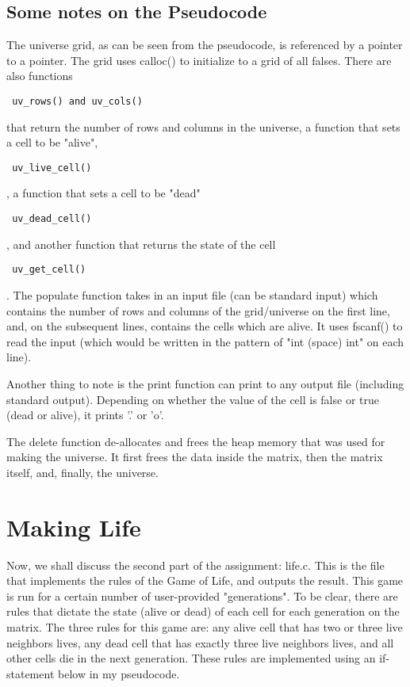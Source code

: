 \documentclass[11pt]{article}
\begin{document}
\subsection{Some notes on the Pseudocode}
The universe grid, as can be seen from the pseudocode, is referenced by a pointer to a pointer. The grid uses calloc() to initialize to a grid of all falses.
There are also functions \begin{verbatim} uv_rows() and uv_cols() \end{verbatim} that return the number of rows and columns in the universe, a function that sets a cell to be "alive", \begin{verbatim} uv_live_cell()\end{verbatim} , a function that sets a cell to be "dead" \begin{verbatim} uv_dead_cell()\end{verbatim}, and another function that returns the state of the cell\begin{verbatim} uv_get_cell()\end{verbatim}.
The populate function takes in an input file (can be standard input) which contains the number of rows and columns of the grid/universe on the first line, and, on the subsequent lines, contains the cells which are alive. It uses fscanf() to read the input (which would be written in the pattern of "int (space) int" on each line). 

Another thing to note is the print function can print to any output file (including standard output). Depending on whether the value of the cell is false or true (dead or alive), it prints '.' or 'o'.

The delete function de-allocates and frees the heap memory that was used for making the universe. It first frees the data inside the matrix, then the matrix itself, and, finally, the universe.

\section{Making Life}
Now, we shall discuss the second part of the assignment: life.c. This is the file that implements the rules of the Game of Life, and outputs the result. This game is run for a certain number of user-provided "generations". To be clear, there are rules that dictate the state (alive or dead) of each cell for each generation on the matrix. The three rules for this game are: any alive cell that has two or three live neighbors lives, any dead cell that has exactly three live neighbors lives, and all other cells die in the next generation. These rules are implemented using an if-statement below in my pseudocode.
\end{document}
